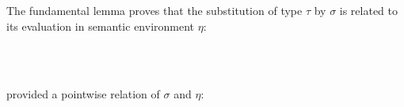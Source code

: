 \documentclass[sigplan,screen]{acmart}
\begin{document}
The fundamental lemma prov\-es that the substitution of type $\tau$ by $\sigma$ is related to its evaluation in semantic environment $\eta$:

\begin{AgdaAlign}
\begin{code}[hide]%
%
\>[2]\AgdaSpace{}%
\AgdaModule{\AgdaUnderscore{}}\AgdaSpace{}%
\AgdaSymbol{\{}\AgdaSymbol{\}}\AgdaSpace{}%
\AgdaSymbol{\{}\AgdaSymbol{\}}\AgdaSpace{}%
\AgdaSymbol{\{}\AgdaSymbol{\}}\AgdaSpace{}%
\AgdaSymbol{\{}\AgdaSpace{}%
\AgdaSymbol{:}\AgdaSpace{}%
\AgdaSpace{}%
\AgdaSpace{}%
\AgdaSymbol{\}}\AgdaSpace{}%
\AgdaSymbol{\{}\AgdaSpace{}%
\AgdaSymbol{:}\AgdaSpace{}%
\AgdaSpace{}%
\AgdaSpace{}%
\AgdaSymbol{\}}\AgdaSpace{}%
\<%
\end{code}
\begin{code}%
\>[2][@{}l@{\AgdaIndent{1}}]%
\>[4]\AgdaSpace{}%
\AgdaSymbol{:}%
\>[3720I]\AgdaSymbol{(}\AgdaSpace{}%
\AgdaSymbol{:}\AgdaSpace{}%
\AgdaSpace{}%
\AgdaSpace{}%
\AgdaSymbol{)}\AgdaSpace{}%
\<%
\\
\>[.][@{}l@{}]\<[3720I]%
\>[15]\AgdaSpace{}%
\AgdaSpace{}%
\AgdaSpace{}%
%
\>[26]\<%
\\
%
\>[15]\AgdaSpace{}%
\AgdaSpace{}%
\AgdaOperator{\AgdaField{[}}\AgdaSpace{}%
\AgdaSpace{}%
\AgdaOperator{\AgdaField{]ₛ}}\AgdaSpace{}%
\AgdaSpace{}%
\AgdaSpace{}%
\AgdaSpace{}%
\AgdaSpace{}%
\<%
\end{code}
\begin{code}[hide]%
%
\>[4]\AgdaSpace{}%
\AgdaSpace{}%
\AgdaSymbol{=}\AgdaSpace{}%
\AgdaSpace{}%
\AgdaSpace{}%
\AgdaSymbol{\{}\AgdaSpace{}%
\AgdaSymbol{=}\AgdaSpace{}%
\AgdaSymbol{\}}\AgdaSpace{}%
\AgdaSymbol{\{}\AgdaSymbol{\}}\<%
\end{code}
\end{AgdaAlign}

\Ni provided a pointwise relation of $\sigma$ and $\eta$:
\end{document}
